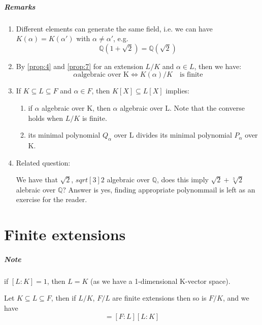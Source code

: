 \subparagraph{Remarks}
\begin{enumerate}
\item Different elements can generate the same field, i.e. we can have $K(\alpha) = K(\alpha')$ with $\alpha \neq \alpha'$, e.g.
  \begin{equation*}
    \mathbb{Q}(1+\sqrt{2}) = \mathbb{Q}(\sqrt{2})
  \end{equation*}

\item By \autoref{prop:4} and \autoref{prop:7} for an extension $L/K$ and $\alpha \in L$, then we have:
  \begin{equation*}
    \alpha \text{algebraic over K} \Leftrightarrow K(\alpha)/K \quad \text{is finite} 
  \end{equation*}

\item If $K \subseteq L \subseteq F$ and $\alpha \in F$, then $K[X] \subseteq L[X]$ implies:
  \begin{enumerate}
  \item if $\alpha$ algebraic over K, then $\alpha$ algebraic over L. Note that the converse holds when $L/K$ is finite.
  \item its minimal polynomial $Q_\alpha$ over L divides its minimal polynomial $P_\alpha$ over K.
  \end{enumerate} 

\item Related question:

We have that $\sqrt{2}$, $sqrt[3]{2}$ algebraic over $\mathbb{Q}$, does this imply $\sqrt{2} + \sqrt[3]{2}$ alebraic over $\mathbb{Q}$? Answer is yes, finding appropriate polynommail is left as an exercise for the reader.
\end{enumerate}

\section{Finite extensions}
\subparagraph{Note} if $[L : K] = 1$, then $L = K$ (as we have a 1-dimensional K-vector space).

\begin{proposition}\label{prop:8}
  Let $K \subseteq L \subseteq F$, then if $L/K$, $F/L$ are finite extensions then so is $F/K$, and we have
  \begin{equation*}
    [F : K] = [F:L][L:K]
  \end{equation*}
\end{proposition}

